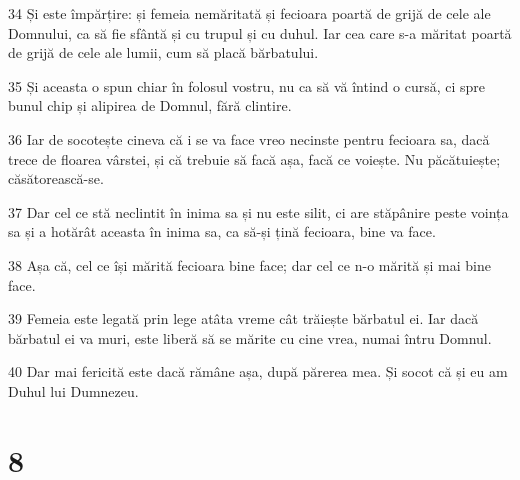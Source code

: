 \par 34 Și este împărțire: și femeia nemăritată și fecioara poartă de grijă de cele ale Domnului, ca să fie sfântă și cu trupul și cu duhul. Iar cea care s-a măritat poartă de grijă de cele ale lumii, cum să placă bărbatului.
\par 35 Și aceasta o spun chiar în folosul vostru, nu ca să vă întind o cursă, ci spre bunul chip și alipirea de Domnul, fără clintire.
\par 36 Iar de socotește cineva că i se va face vreo necinste pentru fecioara sa, dacă trece de floarea vârstei, și că trebuie să facă așa, facă ce voiește. Nu păcătuiește; căsătorească-se.
\par 37 Dar cel ce stă neclintit în inima sa și nu este silit, ci are stăpânire peste voința sa și a hotărât aceasta în inima sa, ca să-și țină fecioara, bine va face.
\par 38 Așa că, cel ce își mărită fecioara bine face; dar cel ce n-o mărită și mai bine face.
\par 39 Femeia este legată prin lege atâta vreme cât trăiește bărbatul ei. Iar dacă bărbatul ei va muri, este liberă să se mărite cu cine vrea, numai întru Domnul.
\par 40 Dar mai fericită este dacă rămâne așa, după părerea mea. Și socot că și eu am Duhul lui Dumnezeu.

\chapter{8}

